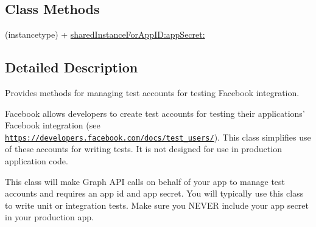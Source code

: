 \subsection*{Class Methods}
\begin{DoxyCompactItemize}
\item 
(instancetype) + \hyperlink{interface_f_b_s_d_k_test_users_manager_a19d2ddda3cf14c5c2969165311cff3e5}{shared\-Instance\-For\-App\-I\-D\-:app\-Secret\-:}
\end{DoxyCompactItemize}


\subsection{Detailed Description}
Provides methods for managing test accounts for testing Facebook integration.

Facebook allows developers to create test accounts for testing their applications' Facebook integration (see \href{https://developers.facebook.com/docs/test_users/}{\tt https\-://developers.\-facebook.\-com/docs/test\-\_\-users/}). This class simplifies use of these accounts for writing tests. It is not designed for use in production application code.

This class will make Graph A\-P\-I calls on behalf of your app to manage test accounts and requires an app id and app secret. You will typically use this class to write unit or integration tests. Make sure you N\-E\-V\-E\-R include your app secret in your production app. 

